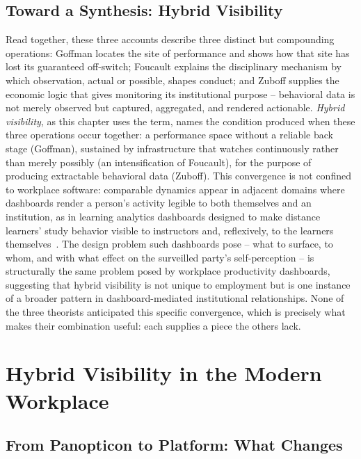 \documentclass[11pt]{article}
\begin{document}
\subsection{Toward a Synthesis: Hybrid Visibility}

Read together, these three accounts describe three distinct but
compounding operations: Goffman locates the site of performance and
shows how that site has lost its guaranteed off-switch; Foucault
explains the disciplinary mechanism by which observation, actual or
possible, shapes conduct; and Zuboff supplies the economic logic
that gives monitoring its institutional purpose -- behavioral data
is not merely observed but captured, aggregated, and rendered
actionable. \textit{Hybrid visibility}, as this chapter uses the
term, names the condition produced when these three operations occur
together: a performance space without a reliable back stage
(Goffman), sustained by infrastructure that watches continuously
rather than merely possibly (an intensification of Foucault), for
the purpose of producing extractable behavioral data (Zuboff). This
convergence is not confined to workplace software: comparable
dynamics appear in adjacent domains where dashboards render a
person's activity legible to both themselves and an institution, as
in learning analytics dashboards designed to make distance
learners' study behavior visible to instructors and, reflexively, to
the learners themselves~\citep{rets2021}. The design problem such
dashboards pose -- what to surface, to whom, and with what effect on
the surveilled party's self-perception -- is structurally the same
problem posed by workplace productivity dashboards, suggesting that
hybrid visibility is not unique to employment but is one instance of
a broader pattern in dashboard-mediated institutional relationships.
None of the three theorists anticipated this specific convergence,
which is precisely what makes their combination useful: each
supplies a piece the others lack.

\section{Hybrid Visibility in the Modern Workplace}
\label{sec:hybrid}

\subsection{From Panopticon to Platform: What Changes}
\end{document}
